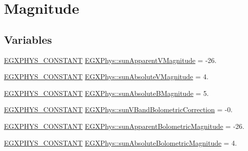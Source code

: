 \hypertarget{group___e_g_x_phys-_constants-_astrophysics-_solar_system-_sun-_magnitude}{}\section{Magnitude}
\label{group___e_g_x_phys-_constants-_astrophysics-_solar_system-_sun-_magnitude}
\subsection*{Variables}
\begin{DoxyCompactItemize}
\item 
\mbox{\hyperlink{group___e_g_x_phys-_constants-_macros_ga76980d288494ce1714c9ac68a95ba702}{E\+G\+X\+P\+H\+Y\+S\+\_\+\+C\+O\+N\+S\+T\+A\+NT}} \mbox{\hyperlink{group___e_g_x_phys-_constants-_astrophysics-_solar_system-_sun-_magnitude_gae6c2268677229fc7d08ac9d1e2b50292}{E\+G\+X\+Phys\+::sun\+Apparent\+V\+Magnitude}} = -\/26.
\item 
\mbox{\hyperlink{group___e_g_x_phys-_constants-_macros_ga76980d288494ce1714c9ac68a95ba702}{E\+G\+X\+P\+H\+Y\+S\+\_\+\+C\+O\+N\+S\+T\+A\+NT}} \mbox{\hyperlink{group___e_g_x_phys-_constants-_astrophysics-_solar_system-_sun-_magnitude_ga1b684bd33050a9567e1a931700be0df3}{E\+G\+X\+Phys\+::sun\+Absolute\+V\+Magnitude}} = 4.
\item 
\mbox{\hyperlink{group___e_g_x_phys-_constants-_macros_ga76980d288494ce1714c9ac68a95ba702}{E\+G\+X\+P\+H\+Y\+S\+\_\+\+C\+O\+N\+S\+T\+A\+NT}} \mbox{\hyperlink{group___e_g_x_phys-_constants-_astrophysics-_solar_system-_sun-_magnitude_gaf502455ab636f55477650dfef5ce6d75}{E\+G\+X\+Phys\+::sun\+Absolute\+B\+Magnitude}} = 5.
\item 
\mbox{\hyperlink{group___e_g_x_phys-_constants-_macros_ga76980d288494ce1714c9ac68a95ba702}{E\+G\+X\+P\+H\+Y\+S\+\_\+\+C\+O\+N\+S\+T\+A\+NT}} \mbox{\hyperlink{group___e_g_x_phys-_constants-_astrophysics-_solar_system-_sun-_magnitude_gaa7571d96b3287465aa072d58ac6fc4e2}{E\+G\+X\+Phys\+::sun\+V\+Band\+Bolometric\+Correction}} = -\/0.
\item 
\mbox{\hyperlink{group___e_g_x_phys-_constants-_macros_ga76980d288494ce1714c9ac68a95ba702}{E\+G\+X\+P\+H\+Y\+S\+\_\+\+C\+O\+N\+S\+T\+A\+NT}} \mbox{\hyperlink{group___e_g_x_phys-_constants-_astrophysics-_solar_system-_sun-_magnitude_ga3346344b395917685d2a52528bf63a43}{E\+G\+X\+Phys\+::sun\+Apparent\+Bolometric\+Magnitude}} = -\/26.
\item 
\mbox{\hyperlink{group___e_g_x_phys-_constants-_macros_ga76980d288494ce1714c9ac68a95ba702}{E\+G\+X\+P\+H\+Y\+S\+\_\+\+C\+O\+N\+S\+T\+A\+NT}} \mbox{\hyperlink{group___e_g_x_phys-_constants-_astrophysics-_solar_system-_sun-_magnitude_ga57682e24f2eef1776c7c3c76f938d44e}{E\+G\+X\+Phys\+::sun\+Absolute\+Bolometric\+Magnitude}} = 4.

\end{DoxyCompactItemize}
